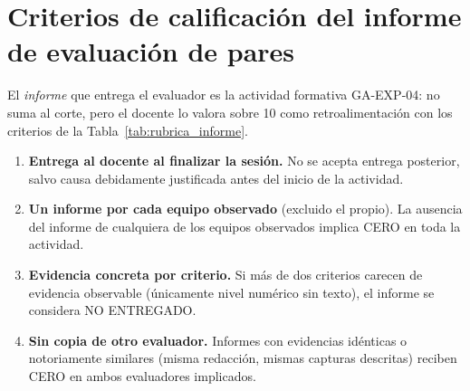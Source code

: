 \documentclass[11pt]{article}
\begin{document}
\section{\textcolor{utegreendk}{Criterios de calificación del informe de evaluación de pares}}

El \emph{informe} que entrega el evaluador es la actividad formativa GA-EXP-04: no suma al corte, pero el docente lo valora sobre 10 como retroalimentación con los criterios de la Tabla~\ref{tab:rubrica_informe}.

\begin{cajapiso}[title={Criterios de piso del informe: incumplimiento implica CERO en el informe}]
	\begin{enumerate}[label=\textbf{P\arabic*.},leftmargin=24pt,itemsep=3pt]
		\item \textbf{Entrega al docente al finalizar la sesión.} No se acepta entrega posterior, salvo causa debidamente justificada antes del inicio de la actividad.
		\item \textbf{Un informe por cada equipo observado} (excluido el propio). La ausencia del informe de cualquiera de los equipos observados implica CERO en toda la actividad.
		\item \textbf{Evidencia concreta por criterio.} Si más de dos criterios carecen de evidencia observable (únicamente nivel numérico sin texto), el informe se considera NO ENTREGADO.
		\item \textbf{Sin copia de otro evaluador.} Informes con evidencias idénticas o notoriamente similares (misma redacción, mismas capturas descritas) reciben CERO en ambos evaluadores implicados.
	\end{enumerate}
\end{cajapiso}
\end{document}

